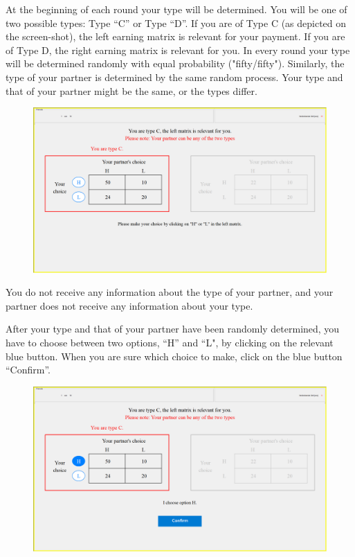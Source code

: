 \documentclass[12pt]{article}
\theoremstyle{break}
\begin{document}
At the beginning of each round your type will be determined. You will be one of two possible types: Type “C” or Type “D”. If you are of Type C (as depicted on the screen-shot), the left earning matrix is relevant for your payment. If you are of Type D, the right earning matrix is relevant for you. In every round your type will be determined randomly with equal probability ("fifty/fifty"). Similarly, the type of your partner is determined by the same random process. Your type and that of your partner might be the same, or the types differ.
 

\begin{figure}[h]
  \centering
    \includegraphics[width=1\textwidth]{fig1-NC-instructions.png}
  \label{fig:fig1-NC-instructions}
\end{figure}




You do not receive any information about the type of your partner, and your partner does not receive any information about your type. 

After your type and that of your partner have been randomly determined, you have to choose between two options, ``H'' and ``L", by clicking on the relevant blue button. When you are sure which choice to make, click on the blue button ``Confirm''.

 \begin{figure}[h]
   \centering
     \includegraphics[width=.9\textwidth]{fig2-NC-instructions.png}
   \label{fig:fig2-NC-instructions}
 \end{figure}
 
\end{document}
